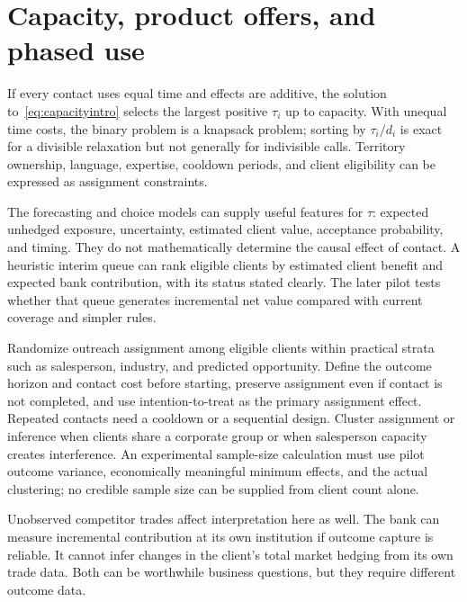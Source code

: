 \section{Capacity, product offers, and phased use}
If every contact uses equal time and effects are additive, the solution to~\eqref{eq:capacityintro} selects the largest positive $\tau_i$ up to capacity. With unequal time costs, the binary problem is a knapsack problem; sorting by $\tau_i/d_i$ is exact for a divisible relaxation but not generally for indivisible calls. Territory ownership, language, expertise, cooldown periods, and client eligibility can be expressed as assignment constraints.

The forecasting and choice models can supply useful features for $\tau$: expected unhedged exposure, uncertainty, estimated client value, acceptance probability, and timing. They do not mathematically determine the causal effect of contact. A heuristic interim queue can rank eligible clients by estimated client benefit and expected bank contribution, with its status stated clearly. The later pilot tests whether that queue generates incremental net value compared with current coverage and simpler rules.

Randomize outreach assignment among eligible clients within practical strata such as salesperson, industry, and predicted opportunity. Define the outcome horizon and contact cost before starting, preserve assignment even if contact is not completed, and use intention-to-treat as the primary assignment effect. Repeated contacts need a cooldown or a sequential design. Cluster assignment or inference when clients share a corporate group or when salesperson capacity creates interference. An experimental sample-size calculation must use pilot outcome variance, economically meaningful minimum effects, and the actual clustering; no credible sample size can be supplied from client count alone.

Unobserved competitor trades affect interpretation here as well. The bank can measure incremental contribution at its own institution if outcome capture is reliable. It cannot infer changes in the client's total market hedging from its own trade data. Both can be worthwhile business questions, but they require different outcome data.
